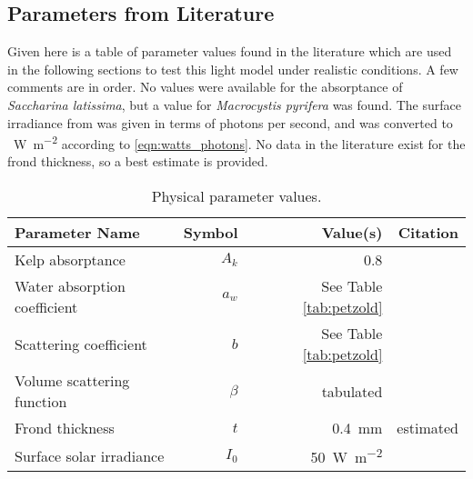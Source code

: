 \subsection{Parameters from Literature}
Given here is a table of parameter values found in the literature which are used in the following sections to test this light model under realistic conditions.
A few comments are in order.
No values were available for the absorptance of \textit{Saccharina latissima}, but a value for \textit{Macrocystis pyrifera} was found.
The surface irradiance from \cite{broch_modelling_2012} was given in terms of photons per second,
and was converted to \SI{}{\W\per\m\squared} according to \eqref{eqn:watts_photons}.
No data in the literature exist for the frond thickness, so a best estimate is provided.

\begin{table}[h]
  \centering
  \caption{Physical parameter values.}
  \begin{tabular}{lrrr}
    \toprule
    Parameter Name & Symbol & Value(s) & Citation \\ %
    \midrule
    Kelp absorptance & $A_k$ & 0.8 & \cite{colombo-pallotta_photosynthetic_2006} \\%
    Water absorption coefficient & $a_w$ & See Table \ref{tab:petzold} & \cite{petzold_volume_1972} \\%
    Scattering coefficient & $b$  & See Table \ref{tab:petzold} & \cite{petzold_volume_1972} \\%
    Volume scattering function & $\beta$ & tabulated & \cite{petzold_volume_1972,sokolov_parameterization_2010} \\%
    Frond thickness & $t$ & \SI{0.4}{\mm} & estimated \\
    Surface solar irradiance & $I_0$ & \SI{50}{\W\per\m\squared} & \cite{broch_modelling_2012}  \\%
    \bottomrule
  \end{tabular}
  \label{tab:params}
\end{table}

